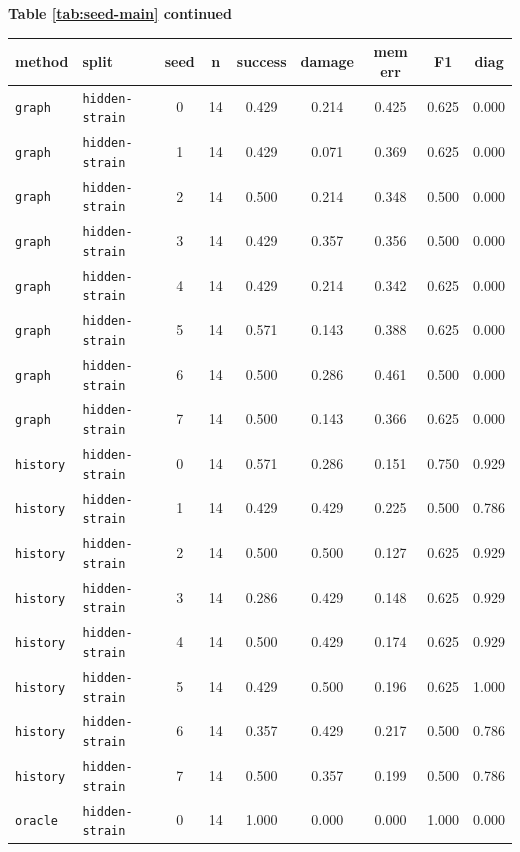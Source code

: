 \documentclass{article}
\begin{document}
\begin{center}
\textbf{Table \ref{tab:seed-main} continued}\\[0.4ex]
\begin{tabular}{llccccccc}
\toprule
method & split & seed & n & success & damage & mem err & F1 & diag \\
\midrule
\texttt{graph} & \texttt{hidden-strain} & 0 & 14 & 0.429 & 0.214 & 0.425 & 0.625 & 0.000 \\
\texttt{graph} & \texttt{hidden-strain} & 1 & 14 & 0.429 & 0.071 & 0.369 & 0.625 & 0.000 \\
\texttt{graph} & \texttt{hidden-strain} & 2 & 14 & 0.500 & 0.214 & 0.348 & 0.500 & 0.000 \\
\texttt{graph} & \texttt{hidden-strain} & 3 & 14 & 0.429 & 0.357 & 0.356 & 0.500 & 0.000 \\
\texttt{graph} & \texttt{hidden-strain} & 4 & 14 & 0.429 & 0.214 & 0.342 & 0.625 & 0.000 \\
\texttt{graph} & \texttt{hidden-strain} & 5 & 14 & 0.571 & 0.143 & 0.388 & 0.625 & 0.000 \\
\texttt{graph} & \texttt{hidden-strain} & 6 & 14 & 0.500 & 0.286 & 0.461 & 0.500 & 0.000 \\
\texttt{graph} & \texttt{hidden-strain} & 7 & 14 & 0.500 & 0.143 & 0.366 & 0.625 & 0.000 \\
\texttt{history} & \texttt{hidden-strain} & 0 & 14 & 0.571 & 0.286 & 0.151 & 0.750 & 0.929 \\
\texttt{history} & \texttt{hidden-strain} & 1 & 14 & 0.429 & 0.429 & 0.225 & 0.500 & 0.786 \\
\texttt{history} & \texttt{hidden-strain} & 2 & 14 & 0.500 & 0.500 & 0.127 & 0.625 & 0.929 \\
\texttt{history} & \texttt{hidden-strain} & 3 & 14 & 0.286 & 0.429 & 0.148 & 0.625 & 0.929 \\
\texttt{history} & \texttt{hidden-strain} & 4 & 14 & 0.500 & 0.429 & 0.174 & 0.625 & 0.929 \\
\texttt{history} & \texttt{hidden-strain} & 5 & 14 & 0.429 & 0.500 & 0.196 & 0.625 & 1.000 \\
\texttt{history} & \texttt{hidden-strain} & 6 & 14 & 0.357 & 0.429 & 0.217 & 0.500 & 0.786 \\
\texttt{history} & \texttt{hidden-strain} & 7 & 14 & 0.500 & 0.357 & 0.199 & 0.500 & 0.786 \\
\texttt{oracle} & \texttt{hidden-strain} & 0 & 14 & 1.000 & 0.000 & 0.000 & 1.000 & 0.000 \\

\end{tabular}
\end{center}
\end{document}
